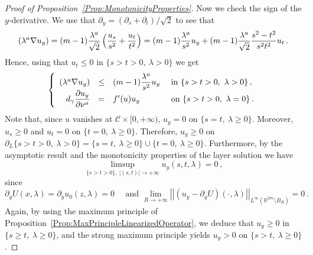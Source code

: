\documentclass[12pt,reqno]{amsart}
\theoremstyle{definition}
\theoremstyle{remark}
\newcommand{\con}[1]{\mathbb{#1}}
\newcommand{\R}{\con{R}} %
\newcommand{\ccal}{\mathscr{C}}
\newcommand{\norm}[1]{\left | \left |{#1} \right | \right |}
\newcommand{\s}{\gamma}
\newcommand{\bpar}[1]{\left ( {#1}\right )}
\newcommand\beqc[1]{\left\{\begin{array}{#1}}
\newcommand\eeqc{\end{array} \right.}
\def\PDEsystem{rcll}
\let\div\relax
\DeclareMathOperator{\div}{div}
\numberwithin{equation}{section}
\begin{document}
\begin{proof}[Proof of Proposition~\ref{Prop:MonotonicityProperties}]
Now we check the sign of the $y$-derivative. We use that $\partial_y = (\partial_s + \partial_t)/\sqrt{2}$ to see that
$$
\div (\lambda^a \nabla u_y) = (m-1) \dfrac{\lambda^a}{\sqrt{2}}\bpar{ \dfrac{u_s}{s^2} + \dfrac{u_t}{t^2} } = (m-1) \dfrac{\lambda^a}{s^2} u_y + (m-1) \dfrac{\lambda^a}{\sqrt{2}} \dfrac{s^2 - t^2}{s^2t^2} u_t \, . 
$$
Hence, using that $u_t \leq 0$ in $ \{ s > t>0,\ \lambda > 0\} $ we get
$$
\beqc{\PDEsystem}
\div (\lambda^a \nabla u_y) &\leq & (m-1) \dfrac{\lambda^a}{s^2} u_y & \text{ in } \{ s > t > 0 ,\ \lambda > 0\}\,, \\
d_\s \dfrac{\partial u_y}{\partial \nu^a}& = & f'(u)u_y& \text{ on }  \{ s > t > 0 , \ \lambda = 0\}\,.
\eeqc
$$
Note that, since $u$ vanishes at $\ccal \times [0, +\infty)$, $u_y = 0$ on $\{ s=t, \ \lambda \geq 0\}$. Moreover, $u_s\geq 0$ and $u_t = 0$ on $\{t=0, \ \lambda \geq 0\}$. Therefore, $u_y \geq 0$ on $\partial_L \{ s > t > 0 ,\ \lambda > 0\} = \{s = t,\ \lambda \geq 0 \}\cup \{t=0, \ \lambda \geq 0\}$. Furthermore, by the asymptotic result and the monotonicity properties of the layer solution we have
$$
\limsup_{\{s> t>0\} ,\ |(s,t)|\to +\infty}  u_y(s,t,\lambda) = 0\,,
$$
since
$$
\partial_y U (x,\lambda) = \partial_y u_0(z,\lambda)=  0 \quad \text{ and } \lim_{R\to +\infty} \norm{(u_y - \partial_y U) (\cdot,\lambda) }_{L^\infty(\R^{2m}\setminus B_{R})} = 0\,.
$$
Again, by using the maximum principle of Proposition~\ref{Prop:MaxPrincipleLinearizedOperator}, we deduce that $u_y \geq 0$ in $\{ s \geq t,\ \lambda \geq 0\}$, and the strong maximum principle yields $u_y > 0$ on $\{ s > t,\ \lambda \geq 0\}$.


\end{proof}
\end{document}
